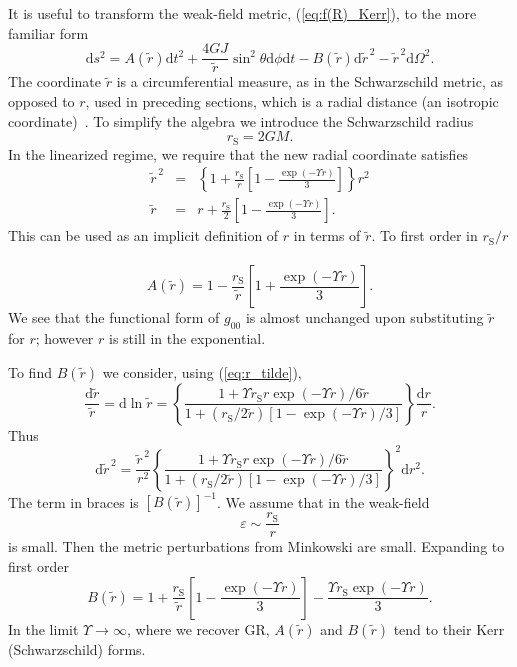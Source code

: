 \documentclass[aps,prd,amsfonts,amssymb,amsmath,nofootinbib,reprint,showpacs]{revtex4-1}
\newcommand{\eqnref}[1]{(\ref{eq:#1})}
\newcommand{\sub}[1]{\ensuremath{_\text{#1}}}
\newcommand{\dd}{\ensuremath{\text{d}}}
\begin{document}
It is useful to transform the weak-field metric, \eqnref{f(R)_Kerr}, to the more familiar form
\begin{equation}
\dd s^2 = A(\widetilde{r}) \dd t^2 + \frac{4GJ}{\widetilde{r}} \sin^2\theta \dd \phi \dd t - B(\widetilde{r})\dd \widetilde{r}^{\,2} - \widetilde{r}^{\,2} \dd \Omega^2.
\label{eq:Sph_sym}
\end{equation}
The coordinate $\widetilde{r}$ is a circumferential measure, as in the Schwarzschild metric, as opposed to $r$, used in preceding sections, which is a radial distance (an isotropic coordinate)~\cite{Misner1973, Olmo2007c}. To simplify the algebra we introduce the Schwarzschild radius
\begin{equation}
r\sub{S} = 2GM.
\end{equation}
In the linearized regime, we require that the new radial coordinate satisfies
\begin{eqnarray}
\widetilde{r}^{\,2} & = & \left\{1 + \frac{r\sub{S}}{r}\left[1 - \frac{\exp(-\Upsilon r)}{3}\right]\right\}r^2 \\
\widetilde{r} & = & r + \frac{r\sub{S}}{2}\left[1 - \frac{\exp(-\Upsilon r)}{3}\right].
\label{eq:r_tilde}
\end{eqnarray}
This can be used as an implicit definition of $r$ in terms of $\widetilde{r}$. To first order in ${r\sub{S}}/{r}$~\cite{Olmo2007c}
\begin{equation}
A(\widetilde{r}) = 1 - \frac{r\sub{S}}{\widetilde{r}}\left[1 + \frac{\exp(-\Upsilon r )}{3}\right].
\label{eq:A_metric}
\end{equation}
We see that the functional form of $g_{00}$ is almost unchanged upon substituting $\widetilde{r}$ for $r$; however $r$ is still in the exponential.

To find $B(\widetilde{r})$ we consider, using \eqnref{r_tilde},
\begin{equation}
\frac{\dd \widetilde{r}}{\widetilde{r}} =  \dd \ln \widetilde{r} = \left\{\frac{1 + {\Upsilon r\sub{S}r\exp(-\Upsilon r)}/{6\widetilde{r}}}{1 + ({r\sub{S}}/{2\widetilde{r}})\left[1 - {\exp(-\Upsilon r)}/{3}\right]}\right\}\frac{\dd r}{r}.
\end{equation}
Thus
\begin{equation}
\dd \widetilde{r}^{\,2} = \frac{\widetilde{r}^{\,2}}{r^2}\left\{\frac{1 + {\Upsilon r\sub{S}r\exp(-\Upsilon r)}/{6\widetilde{r}}}{1 + ({r\sub{S}}/{2\widetilde{r}})\left[1 - {\exp(-\Upsilon r)}/{3}\right]}\right\}^2 \dd r^2.
\end{equation}
The term in braces is $\left[B(\widetilde{r})\right]^{-1}$. We assume that in the weak-field
\begin{equation}
\varepsilon \sim \frac{r\sub{S}}{r}
\end{equation}
is small. Then the metric perturbations from Minkowski are small. Expanding to first order~\cite{Olmo2007c}
\begin{equation}
B(\widetilde{r})  = 1 + \frac{r\sub{S}}{\widetilde{r}}\left[1 - \frac{\exp(-\Upsilon r )}{3}\right] - \frac{\Upsilon r\sub{S} \exp(-\Upsilon r)}{3}.
\label{eq:B_metric}
\end{equation}
In the limit $\Upsilon \rightarrow \infty$, where we recover GR, $A(\widetilde{r})$ and $B(\widetilde{r})$ tend to their Kerr (Schwarzschild) forms.
\end{document}
